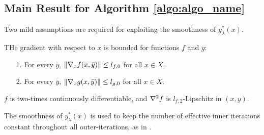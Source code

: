 















\subsection{Main Result for Algorithm \ref{algo:algo_name}}

Two mild assumptions are required for exploiting the smoothness of $y_{\lambda}^*(x)$.
\begin{assumption}
    \label{assumption:bounded_grad_x}
    THe gradient with respect to $x$ is bounded for functions $f$ and $g$:
    \begin{enumerate}
        \item[1.] For every $\bar{y}$, $\|\nabla_x f(x, \bar{y})\| \le l_{f,0}$ for all $x \in X$.
        \item[2.] For every $\bar{y}$, $\|\nabla_x g(x, \bar{y})\| \le l_{g,0}$ for all $x \in X$.
    \end{enumerate}
\end{assumption}
\begin{assumption}
    \label{assumption:extra_smooth_f}
    $f$ is two-times continuously differentiable, and $\nabla^2 f$ is $l_{f,2}$-Lipschitz in $(x,y)$.
\end{assumption}
The smoothness of $y^*_\lambda(x)$ is used to keep the number of effective inner iterations constant throughout all outer-iterations, as in \cite{chen2021closing}. %

